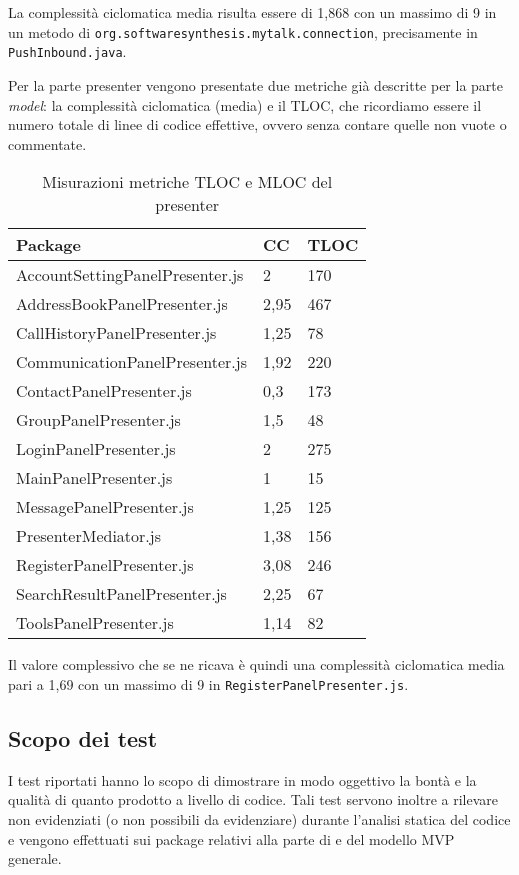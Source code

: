 La complessità ciclomatica media risulta essere di 1,868 con un massimo di 9 in un metodo di \texttt{org.softwaresynthesis.mytalk.connection}, precisamente in \texttt{PushInbound.java}.

Per la parte presenter vengono presentate due metriche già descritte per la parte \textit{model}: la complessità ciclomatica (media) e il TLOC, che ricordiamo essere il numero totale di linee di codice effettive, ovvero senza contare quelle non vuote o commentate.

\begin{table}[H]
\centering
{}
\begin{tabular}{p{}ll}
\toprule Package & CC  & TLOC\\
\midrule
AccountSettingPanelPresenter.js & 2 & 170\\
AddressBookPanelPresenter.js & 2,95 & 467\\
CallHistoryPanelPresenter.js & 1,25 & 78\\
CommunicationPanelPresenter.js & 1,92 & 220\\
ContactPanelPresenter.js & 0,3 & 173\\
GroupPanelPresenter.js & 1,5 & 48\\
LoginPanelPresenter.js & 2 & 275\\
MainPanelPresenter.js & 1 & 15\\
MessagePanelPresenter.js & 1,25 & 125\\
PresenterMediator.js & 1,38 & 156\\
RegisterPanelPresenter.js & 3,08 & 246\\
SearchResultPanelPresenter.js & 2,25 & 67\\
ToolsPanelPresenter.js & 1,14 & 82\\
\bottomrule
\end{tabular}
\caption{Misurazioni metriche TLOC e MLOC del presenter} \label{tab: metricheTLOCMLOCpresenter}
\end{table}
Il valore complessivo che se ne ricava è quindi una complessità ciclomatica media pari a 1,69 con un massimo di 9 in \texttt{RegisterPanelPresenter.js}.


\subsection{Scopo dei test}
I test riportati hanno lo scopo di dimostrare in modo oggettivo la bontà e la qualità di quanto prodotto a livello di codice. Tali test servono inoltre a rilevare  non evidenziati (o non possibili da evidenziare) durante l'analisi statica del codice e vengono effettuati sui package relativi alla parte di  e  del modello MVP generale.

